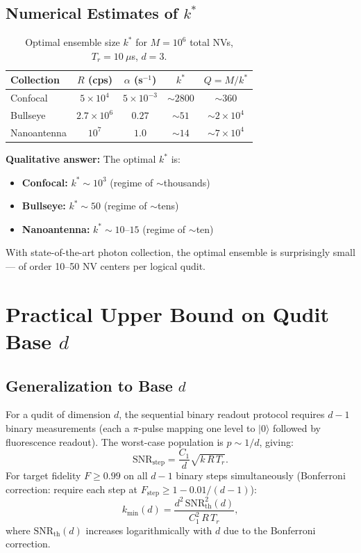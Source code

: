 \documentclass[11pt,letterpaper]{article}
\begin{document}
\subsection{Numerical Estimates of $k^*$}

\begin{table}[h]
\centering
\caption{Optimal ensemble size $k^*$ for $M = 10^6$ total NVs,
$T_r = 10~\mu$s, $d = 3$.}
\label{tab:kstar}
\begin{tabular}{lcccc}
\toprule
\textbf{Collection} & $R$ (cps) & $\alpha$ (s$^{-1}$) & $k^*$ & $Q = M/k^*$ \\
\midrule
Confocal & $5 \times 10^4$ & $5 \times 10^{-3}$ & $\sim 2800$ & $\sim 360$ \\
Bullseye & $2.7 \times 10^6$ & $0.27$ & $\sim 51$ & $\sim 2 \times 10^4$ \\
Nanoantenna & $10^7$ & $1.0$ & $\sim 14$ & $\sim 7 \times 10^4$ \\
\bottomrule
\end{tabular}
\end{table}

\textbf{Qualitative answer:} The optimal $k^*$ is:
\begin{itemize}
  \item \textbf{Confocal:} $k^* \sim 10^3$ (regime of $\sim$thousands)
  \item \textbf{Bullseye:} $k^* \sim 50$ (regime of $\sim$tens)
  \item \textbf{Nanoantenna:} $k^* \sim 10$--$15$ (regime of $\sim$ten)
\end{itemize}
With state-of-the-art photon collection, the optimal ensemble is
surprisingly small --- of order 10--50 NV centers per logical qudit.


\section{Practical Upper Bound on Qudit Base $d$}
\label{sec:maxd}

\subsection{Generalization to Base $d$}

For a qudit of dimension $d$, the sequential binary readout protocol
requires $d-1$ binary measurements (each a $\pi$-pulse mapping one level
to $|0\rangle$ followed by fluorescence readout).  The worst-case population
is $p \sim 1/d$, giving:
\begin{equation}
  \text{SNR}_{\text{step}} = \frac{C_1}{d} \sqrt{k \, R \, T_r}.
\end{equation}
For target fidelity $F \geq 0.99$ on all $d-1$ binary steps simultaneously
(Bonferroni correction: require each step at $F_{\text{step}} \geq 1 - 0.01/(d-1)$):
\begin{equation}
  k_{\min}(d) = \frac{d^2 \, \text{SNR}_{\text{th}}^2(d)}{C_1^2 \, R \, T_r},
  \label{eq:kmin_d}
\end{equation}
where $\text{SNR}_{\text{th}}(d)$ increases logarithmically with $d$ due to
the Bonferroni correction.
\end{document}

